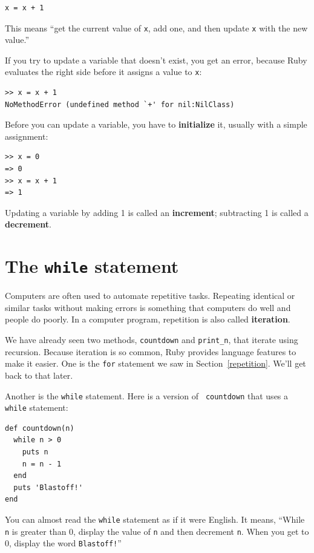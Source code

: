 \documentclass[10pt]{book}
\begin{document}
\begin{verbatim}
x = x + 1
\end{verbatim}
%
This means ``get the current value of {\tt x}, add one, and then
update {\tt x} with the new value.''

If you try to update a variable that doesn't exist, you get an
error, because Ruby evaluates the right side before it assigns
a value to {\tt x}:

\begin{verbatim}
>> x = x + 1
NoMethodError (undefined method `+' for nil:NilClass)
\end{verbatim}
%
Before you can update a variable, you have to {\bf initialize}
it, usually with a simple assignment:

\begin{verbatim}
>> x = 0
=> 0
>> x = x + 1
=> 1
\end{verbatim}
%
Updating a variable by adding 1 is called an {\bf increment};
subtracting 1 is called a {\bf decrement}.




\section{The {\tt while} statement}

Computers are often used to automate repetitive tasks.  Repeating
identical or similar tasks without making errors is something that
computers do well and people do poorly.  In a computer program,
repetition is also called {\bf iteration}.

We have already seen two methods, {\tt countdown} and
\verb"print_n", that iterate using recursion.  Because iteration is so
common, Ruby provides language features to make it easier.
One is the {\tt for} statement we saw in Section~\ref{repetition}.
We'll get back to that later.

Another is the {\tt while} statement.  Here is a version of {\tt
countdown} that uses a {\tt while} statement:

\begin{verbatim}
def countdown(n)
  while n > 0
    puts n
    n = n - 1
  end
  puts 'Blastoff!'
end
\end{verbatim}
%
You can almost read the {\tt while} statement as if it were English.
It means, ``While {\tt n} is greater than 0,
display the value of {\tt n} and then decrement
{\tt n}.  When you get to 0, display the word {\tt Blastoff!}''
\end{document}
